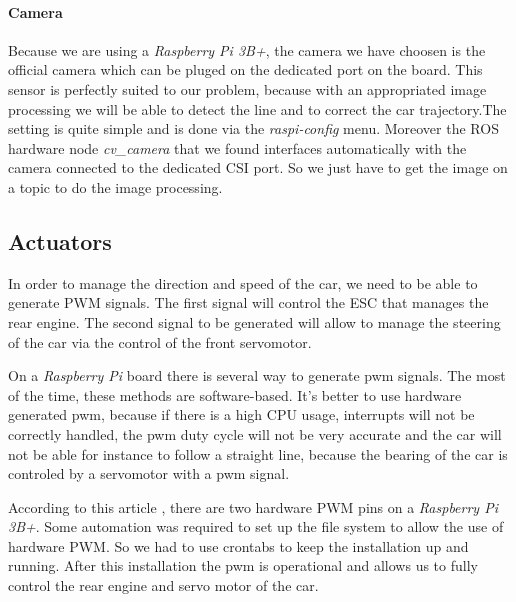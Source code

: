 \paragraph{Camera}
Because we are using a \textit{Raspberry Pi 3B+}, the camera we have choosen is the official 
camera which can be pluged on the dedicated port on the board. This sensor is
perfectly suited to our problem, because with an appropriated image processing
we will be able to detect the line and to correct the car trajectory.The setting is quite simple and is done via the \textit{raspi-config} menu. Moreover the ROS hardware node \textit{cv\_camera} that we found interfaces automatically with the camera connected to the dedicated CSI port. So we just have to get the image on a topic to do the image processing.

\subsection{Actuators}
In order to manage the direction and speed of the car, we need to be able to generate PWM signals. The first signal will control the ESC that manages the rear engine. The second signal to be generated will allow to manage the steering of the car via the control of the front servomotor.

On a \textit{Raspberry Pi} board there is several way to generate pwm signals.
The most of the time, these methods are software-based. It's better to use hardware 
generated pwm, because if there is a high CPU usage, interrupts
will not be correctly handled, the pwm duty cycle will not be very accurate and
the car will not be able for instance to follow a straight line, because the
bearing of the car is controled by a servomotor with a pwm signal.

According to this article \cite{pi_pwm}, there are two hardware PWM pins on a \textit{Raspberry Pi 3B+}. Some automation was required to set up the file system to allow the use of hardware PWM. So we had to use crontabs to keep the installation up and running.
After this installation the pwm is operational and allows us to fully control the rear engine and servo motor of the car.